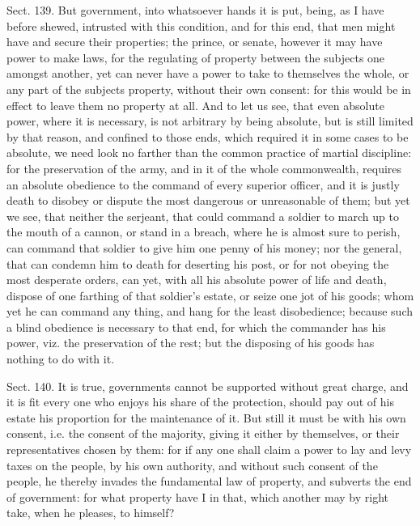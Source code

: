 \documentclass[11pt,openany]{book}
\begin{document}
Sect. 139. But government, into whatsoever hands it is put, being, as I have before shewed, intrusted with this condition, and for this end, that men might have and secure their properties; the prince, or senate, however it may have power to make laws, for the regulating of property between the subjects one amongst another, yet can never have a power to take to themselves the whole, or any part of the subjects property, without their own consent: for this would be in effect to leave them no property at all. And to let us see, that even absolute power, where it is necessary, is not arbitrary by being absolute, but is still limited by that reason, and confined to those ends, which required it in some cases to be absolute, we need look no farther than the common practice of martial discipline: for the preservation of the army, and in it of the whole commonwealth, requires an absolute obedience to the command of every superior officer, and it is justly death to disobey or dispute the most dangerous or unreasonable of them; but yet we see, that neither the serjeant, that could command a soldier to march up to the mouth of a cannon, or stand in a breach, where he is almost sure to perish, can command that soldier to give him one penny of his money; nor the general, that can condemn him to death for deserting his post, or for not obeying the most desperate orders, can yet, with all his absolute power of life and death, dispose of one farthing of that soldier's estate, or seize one jot of his goods; whom yet he can command any thing, and hang for the least disobedience; because such a blind obedience is necessary to that end, for which the commander has his power, viz. the preservation of the rest; but the disposing of his goods has nothing to do with it.

Sect. 140. It is true, governments cannot be supported without great charge, and it is fit every one who enjoys his share of the protection, should pay out of his estate his proportion for the maintenance of it. But still it must be with his own consent, i.e. the consent of the majority, giving it either by themselves, or their representatives chosen by them: for if any one shall claim a power to lay and levy taxes on the people, by his own authority, and without such consent of the people, he thereby invades the fundamental law of property, and subverts the end of government: for what property have I in that, which another may by right take, when he pleases, to himself?
\end{document}
